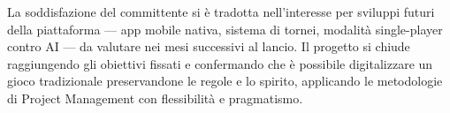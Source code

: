 La soddisfazione del committente si è tradotta nell'interesse per sviluppi futuri della piattaforma --- app mobile nativa, sistema di tornei, modalità single-player contro AI --- da valutare nei mesi successivi al lancio. Il progetto si chiude raggiungendo gli obiettivi fissati e confermando che è possibile digitalizzare un gioco tradizionale preservandone le regole e lo spirito, applicando le metodologie di Project Management con flessibilità e pragmatismo.
